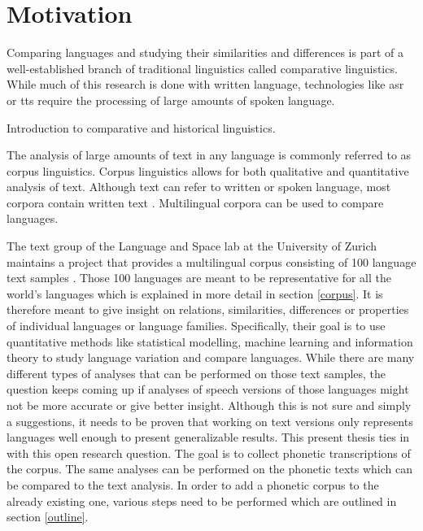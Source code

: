
\label{chap:1_intro}
\section{Motivation}
Comparing languages and studying their similarities and differences is part of a well-established branch of traditional linguistics called comparative linguistics. While much of this research is done with written language, technologies like \ac{asr} or \ac{tts} require the processing of large amounts of spoken language. 

Introduction to comparative and historical linguistics. \citep{Hock&Joseph.2019}

The analysis of large amounts of text in any language is commonly referred to as corpus linguistics. Corpus linguistics allows for both qualitative and quantitative analysis of text. Although text can refer to written or spoken language, most corpora contain written text \citep{McEnery&Hardie.2011}. Multilingual corpora can be used to compare languages.

The text group of the Language and Space lab at the University of Zurich maintains a project that provides a multilingual corpus consisting of 100 language text samples \citep{UniversityofZurich.19.07.2021}. Those 100 languages are meant to be representative for all the world's languages which is explained in more detail in section \ref{corpus}. It is therefore meant to give insight on relations, similarities, differences or properties of individual languages or language families. Specifically, their goal is to use quantitative methods like statistical modelling, machine learning and information theory to study language variation and compare languages. While there are many different types of analyses that can be performed on those text samples, the question keeps coming up if analyses of speech versions of those languages might not be more accurate or give better insight. Although this is not sure and simply a suggestions, it needs to be proven that working on text versions only represents languages well enough to present generalizable results. This present thesis ties in with this open research question. The goal is to collect phonetic transcriptions of the corpus. The same analyses can be performed on the phonetic texts which can be compared to the text analysis. In order to add a phonetic corpus to the already existing one, various steps need to be performed which are outlined in section \ref{outline}.

